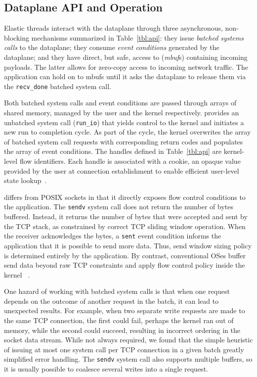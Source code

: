 \subsection{Dataplane API and Operation}
\label{sec:impl:api}

Elastic threads interact with the \ix dataplane through three
asynchronous, non-blocking mechanisms summarized in
Table~\ref{tbl:api}: they issue \emph{batched systems calls} to the
dataplane; they consume \emph{event conditions} generated by the
dataplane; and they have direct, but safe, access to (\emph{mbuf}s)
containing incoming payloads.  The latter allows for zero-copy access
to incoming network traffic.  The application can hold on to mbufs
until it asks the dataplane to release them via the
\texttt{recv\_done} batched system call.

Both batched system calls and event conditions are passed through
arrays of shared memory, managed by the user and the kernel
respectively.  \ix provides an unbatched system call
(\texttt{run\_io}) that yields control to the kernel and initiates a
new run to completion cycle. As part of the cycle, the kernel
overwrites the array of batched system call requests with
corresponding return codes and populates the array of event
conditions.  The handles defined in Table~\ref{tbl:api} are
kernel-level flow identifiers. Each handle is associated with a
cookie, an opaque value provided by the user at connection
establishment to enable efficient user-level state
lookup~\cite{DBLP:conf/osdi/HanMCR12}. %

\ix differs from POSIX sockets in that it directly exposes flow
control conditions to the application. The \texttt{sendv} system call
does not return the number of bytes buffered. Instead, it returns the
number of bytes that were accepted and sent by the TCP stack, as
constrained by correct TCP sliding window operation. When the receiver
acknowledges the bytes, a \texttt{sent} event condition informs the
application that it is possible to send more data. Thus, send window
sizing policy is determined entirely by the application.  By contrast,
conventional OSes buffer send data beyond raw TCP constraints and
apply flow control policy inside the kernel ~\cite{dynamicwindow}.

One hazard of working with batched system calls is that when one
request depends on the outcome of another request in the batch, it can
lead to unexpected results. For example, when two separate write
requests are made to the same TCP connection, the first could fail,
perhaps the kernel ran out of memory, while the second could succeed,
resulting in incorrect ordering in the socket data stream. While not
always required, we found that the simple heuristic of issuing at most
one system call per TCP connection in a given batch greatly simplified
error handling. The \texttt{sendv} system call also supports multiple
buffers, so it is usually possible to coalesce several writes into a
single request.


